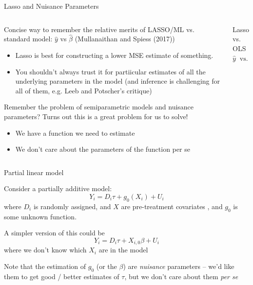 \documentclass[notes,11pt, aspectratio=169]{beamer}
\newenvironment{wideitemize}{\itemize\addtolength{\itemsep}{10pt}}{\enditemize}
\begin{document}
\begin{frame}{Lasso and Nuisance Parameters}
    \begin{columns}[T] %
    \begin{column}{.8\textwidth}
  \begin{wideitemize}
  \item Concise way to remember the relative merits of LASSO/ML
    vs. standard model: $\hat{y}$ vs $\hat{\beta}$ (Mullanaithan and
    Spiess (2017))
    \begin{itemize}
    \item Lasso is best for constructing a lower MSE estimate of
      something.
    \item You shouldn't always trust it for partiicular estimates of
      all the underlying parameters in the model (and inference is
      challenging for all of them, e.g. Leeb and Potscher's critique)
    \end{itemize}
  \item Remember the problem of semiparametric models and nuisance
    parameters? Turns out this is a great problem for us to solve!
    \begin{itemize}
    \item We have a function we need to estimate
    \item We don't care about the parameters of the function per se
    \end{itemize}
  \end{wideitemize}
\end{column}
\begin{column}{.3\textwidth}
  \begin{center}
    Lasso     vs.    OLS
$$\hat{y} \;\; \text{vs.} \;\; \hat{\beta}$$
    \end{center}
  \end{column}
\end{columns}

\end{frame}

\begin{frame}{Partial linear model}
  \begin{wideitemize}
  \item Consider a partially additive model:
    $$Y_{i} = D_{i}\tau + g_{0}(X_{i}) + U_{i}$$
    where $D_{i}$ is randomly assigned, and $X$ are pre-treatment covariates , and $g_{0}$ is some unknown function.
  \item A simpler version of this could be
    $$Y_{i} = D_{i}\tau + X_{i,0}\beta + U_{i}$$
    where we don't know which $X_{i}$ are in the model
  \item Note that the estimation of $g_{0}$ (or the $\beta$) are
    \emph{nuisance} parameters -- we'd like them to get good / better
    estimates of $\tau$, but we don't care about them \emph{per se}
  \end{wideitemize}
\end{frame}
\end{document}
